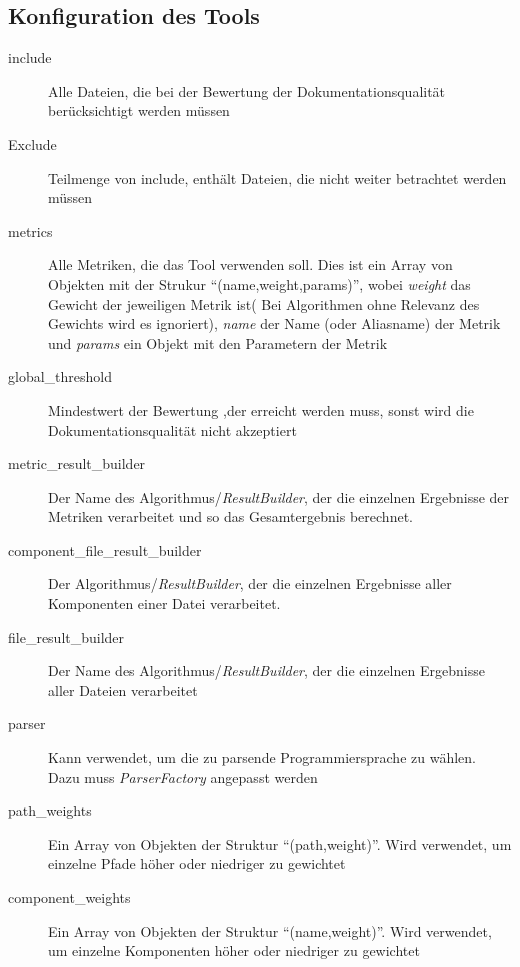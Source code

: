 \begin{appendices}
\chapter{Konfiguration des Tools}
\begin{description}
        \item[include]  Alle Dateien, die bei der Bewertung der Dokumentationsqualität berücksichtigt werden müssen
        \item[Exclude]  Teilmenge von include, enthält Dateien, die nicht weiter betrachtet werden müssen
        \item[metrics]  Alle Metriken, die das Tool verwenden soll. Dies ist ein Array von Objekten mit der Strukur \enquote{(name,weight,params)}, wobei \textit{weight} das Gewicht der jeweiligen Metrik ist( Bei Algorithmen ohne Relevanz des Gewichts wird es ignoriert), \textit{name} der Name (oder Aliasname) der Metrik und \textit{params} ein Objekt mit den Parametern der Metrik
        \item[global\_threshold] Mindestwert der Bewertung ,der erreicht werden muss, sonst wird die Dokumentationsqualität nicht akzeptiert
        \item[metric\_result\_builder] Der Name des Algorithmus/\textit{ResultBuilder}, der die einzelnen Ergebnisse der Metriken verarbeitet und so das Gesamtergebnis berechnet.
        
          \item[component\_file\_result\_builder] Der Algorithmus/\textit{ResultBuilder}, der die einzelnen Ergebnisse aller Komponenten einer Datei verarbeitet.
          
        \item[file\_result\_builder] Der Name des Algorithmus/\textit{ResultBuilder}, der die einzelnen Ergebnisse aller Dateien verarbeitet
        
        \item[parser]  Kann verwendet, um die zu parsende Programmiersprache zu wählen. Dazu muss \textit{ParserFactory} angepasst werden
        
        \item[path\_weights] Ein Array von Objekten der Struktur \enquote{(path,weight)}. Wird verwendet, um einzelne Pfade höher oder niedriger zu gewichtet
        
         \item[component\_weights] Ein Array von Objekten der Struktur \enquote{(name,weight)}. Wird verwendet, um einzelne Komponenten höher oder niedriger zu gewichtet
         

\end{description}
\end{appendices}
